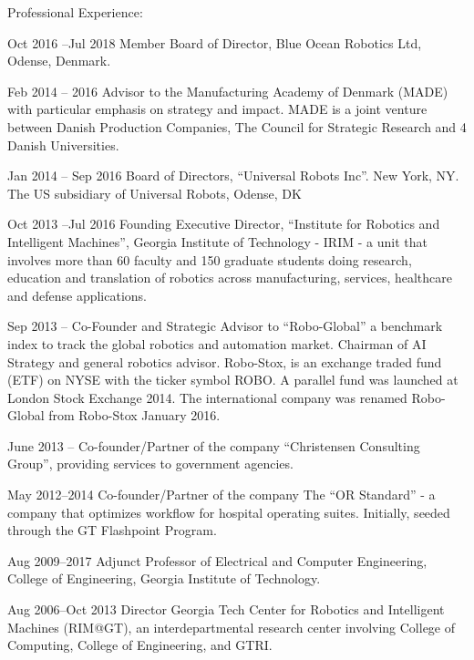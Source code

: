 \documentclass{article}
\begin{document}
\begin{cv}
\begin{cvlist}{Professional Experience:}
\item[Oct 2016 --Jul 2018] Member Board of Director, Blue Ocean Robotics Ltd,
  Odense, Denmark.

\item[Feb 2014 -- 2016] Advisor to the Manufacturing Academy of
  Denmark (MADE) with particular emphasis on strategy and impact. MADE
  is a joint venture between Danish Production Companies, The Council
  for Strategic Research and 4 Danish Universities.

\item[Jan 2014 -- Sep 2016] Board of Directors, ``Universal Robots
  Inc''. New York, NY.  The US subsidiary of Universal Robots, Odense,
  DK

\item[Oct 2013 --Jul 2016] Founding Executive Director,
  ``Institute for Robotics and Intelligent
  Machines'', Georgia Institute of Technology - IRIM - a unit that
  involves more than 60 faculty and 150 graduate students doing
  research, education and translation of robotics across
  manufacturing, services, healthcare and defense applications.

\item[Sep 2013 --] Co-Founder and Strategic Advisor to ``Robo-Global''
  a benchmark index to track the global robotics and automation
  market. Chairman of AI Strategy and general robotics
  advisor. Robo-Stox, is an exchange traded fund (ETF) on NYSE with
  the ticker symbol ROBO.  A parallel fund was launched at London
  Stock Exchange 2014. The international company was renamed
  Robo-Global from Robo-Stox January 2016.

\item[June 2013 --] Co-founder/Partner of the company ``Christensen
  Consulting Group'', providing services to government agencies.

\item[May 2012--2014] Co-founder/Partner of the company The ``OR
  Standard'' - a company that optimizes workflow for hospital
  operating suites. Initially, seeded through the GT Flashpoint
  Program.

\item[Aug 2009--2017] Adjunct Professor of Electrical and Computer
  Engineering, College of Engineering, Georgia Institute of
  Technology.

\item[Aug 2006--Oct 2013] Director Georgia Tech Center for Robotics and
  Intelligent Machines (RIM@GT), an interdepartmental research center
  involving College of Computing, College of Engineering, and GTRI.


\end{cvlist}
\end{cv}
\end{document}
